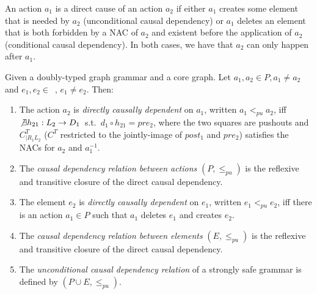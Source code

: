 \begin{intuition} An action $a_1$ is a direct cause of an action $a_2$ if either $a_1$ creates some element that is needed by $a_2$ (unconditional causal dependency) or $a_1$ deletes an element that is both forbidden by a NAC of $a_2$ and existent before the application of $a_2$ (conditional causal dependency). In both cases, we have that $a_2$ can only happen after $a_1$. 
\end{intuition}

\begin{definition} Given \doublyTypedGraphGrammarCore{} a doubly-typed graph grammar and \coreGraph{} a core graph. Let $a_1, a_2 \in P, a_1 \ne a_2$ and \mbox{$e_1, e_2 \in $ \coreGraph{},} $e_1 \ne e_2$. Then: 

  \begin{enumerate}
    \item The action $a_2$ is \emph{directly causally dependent} on $a_1$, written $a_1 <_{pu} a_2$, iff \mbox{$\not\exists h_{21} : L_2 \rightarrow D_1$ s.t. \mbox{$d_1 \circ h_{21} = pre_2$}}, where the two squares are pushouts and $C^T_{|R_1L_2}$ ($C^T$ restricted to the jointly-image of $post_1$ and $pre_2$) satisfies the NACs for $a_2$ and $a_1^{-1}$.


   \item The \emph{causal dependency relation between actions} $(P, \leq_{pu})$ is the reflexive and transitive closure of the direct causal dependency.
   \item The element $e_2$ is \emph{directly causally dependent} on $e_1$, written $e_1 <_{pu} e_2$, iff there is an action $a_1 \in P$ such that $a_1$ deletes $e_1$ and creates $e_2$.
   \item The \emph{causal dependency relation between elements} $(E, \leq_{pu})$ is the reflexive and transitive closure of the direct causal dependency.
   \item The \emph{unconditional causal dependency relation} of a strongly safe grammar is defined by $(P \cup E, \leq_{pu})$.
  \end{enumerate}
\end{definition}


